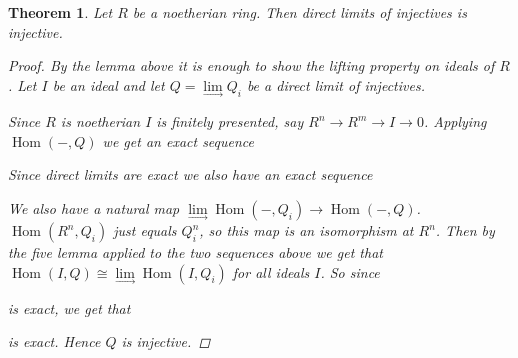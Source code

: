 \documentclass[11pt, a4paper, english]{article}
\newtheorem{theorem}{Theorem}[section]
\theoremstyle{definition}
\DeclareMathOperator{\Hom}{Hom}
\begin{document}
\begin{theorem}\cite[Chapter I, Exercise 8]{CE56}
	Let $R$ be a noetherian ring. Then direct limits of injectives is injective.
	\begin{proof}
		By the lemma above it is enough to show the lifting property on ideals of $R$. Let $I$ be an ideal and let $Q = \lim\limits_{\rightarrow} Q_i$ be a direct limit of injectives.
		
		Since $R$ is noetherian $I$ is finitely presented, say $R^n \to R^m \to I \to 0$. Applying $\Hom(-,Q)$ we get an exact sequence 
		\begin{center}
		\end{center}
		Since direct limits are exact we also have an exact sequence
		\begin{center}
		\end{center}
		We also have a natural map $\lim\limits_{\rightarrow}\Hom(-, Q_i) \to \Hom(-, Q)$. $\Hom(R^n, Q_i)$ just equals $Q_i^n$, so this map is an isomorphism at $R^n$. Then by the five lemma applied to the two sequences above we get that $\Hom(I, Q) \cong \lim\limits_{\rightarrow}\Hom(I, Q_i)$ for all ideals $I$. So since 
		\begin{center}
		\end{center}
		is exact, we get that
		\begin{center}
		\end{center}
	is exact. Hence $Q$ is injective.
	\end{proof}
\end{theorem}

\clearpage


%

\end{document}
